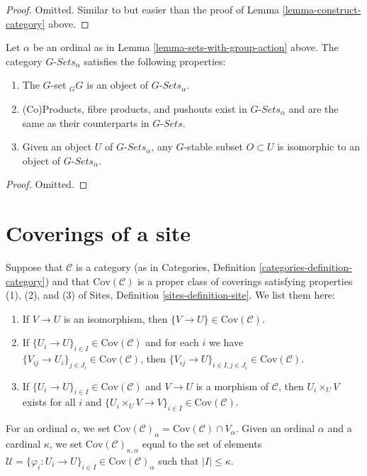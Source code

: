 \begin{proof}
Omitted. Similar to but easier than the proof of
Lemma \ref{lemma-construct-category} above.
\end{proof}

\begin{lemma}
\label{lemma-what-is-in-it-G-sets}
Let $\alpha$ be an ordinal as in Lemma \ref{lemma-sets-with-group-action}
above. The category $G\textit{-Sets}_\alpha$ satisfies the following
properties:
\begin{enumerate}
\item The $G$-set ${}_GG$ is an object of $G\textit{-Sets}_\alpha$.
\item (Co)Products, fibre products, and pushouts
exist in $G\textit{-Sets}_\alpha$
and are the same as their counterparts in $G\textit{-Sets}$.
\item Given an object $U$ of $G\textit{-Sets}_\alpha$,
any $G$-stable subset $O \subset U$  is isomorphic to an object
of $G\textit{-Sets}_\alpha$.
\end{enumerate}
\end{lemma}

\begin{proof}
Omitted.
\end{proof}

\section{Coverings of a site}
\label{section-coverings-site}

\noindent
Suppose that $\mathcal{C}$ is a category (as in
Categories, Definition \ref{categories-definition-category}) and
that $\text{Cov}(\mathcal{C})$ is a proper class of coverings
satisfying properties (1), (2), and (3) of Sites,
Definition \ref{sites-definition-site}. We list them here:
\begin{enumerate}
\item If $V \to U$ is an isomorphism, then $\{V \to U\} \in
\text{Cov}(\mathcal{C})$.
\item If $\{U_i \to U\}_{i\in I} \in \text{Cov}(\mathcal{C})$ and for each
$i$ we have $\{V_{ij} \to U_i\}_{j\in J_i} \in \text{Cov}(\mathcal{C})$, then
$\{V_{ij} \to U\}_{i \in I, j\in J_i} \in \text{Cov}(\mathcal{C})$.
\item If $\{U_i \to U\}_{i\in I}\in \text{Cov}(\mathcal{C})$
and $V \to U$ is a morphism of $\mathcal{C}$, then $U_i \times_U V$
exists for all $i$ and
$\{U_i \times_U V \to V \}_{i\in I} \in \text{Cov}(\mathcal{C})$.
\end{enumerate}
For an ordinal $\alpha$, we set
$\text{Cov}(\mathcal{C})_\alpha = \text{Cov}(\mathcal{C}) \cap V_\alpha$.
Given an ordinal $\alpha$ and a cardinal $\kappa$, we set
$\text{Cov}(\mathcal{C})_{\kappa, \alpha}$ equal to the set
of elements
$\mathcal{U} =
\{\varphi_i : U_i \to U\}_{i\in I} \in \text{Cov}(\mathcal{C})_\alpha$
such that $|I| \leq \kappa$.

